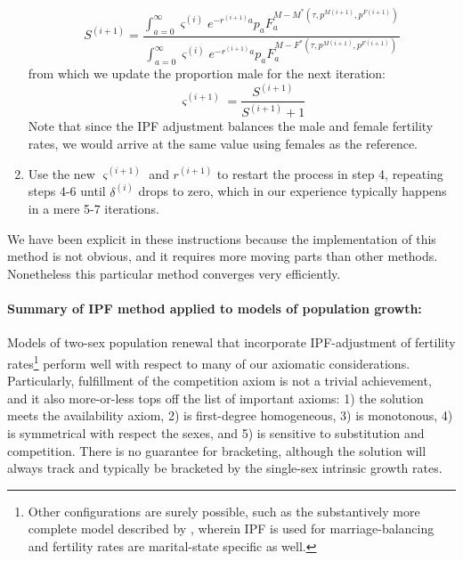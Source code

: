 \begin{enumerate}
  \begin{equation}
  S^{(i+1)} = \frac{\int_{a=0}^\infty \varsigma^{(i)}
  e^{-r^{(i+1)}a}p_aF_a^{M-M^\ast(\tau,p^{M(i+1)}, p^{F(i+1)})}}{\int_{a=0}^\infty
  \varsigma^{(i)} e^{-r^{(i+1)}a}p_aF_a^{M-F^\ast(\tau,p^{M(i+1)}, p^{F(i+1)})}}
  \end{equation}
  from which we update the proportion male for the next iteration:
  \begin{equation}
  \varsigma^{(i+1)} = \frac{S^{(i+1)}}{S^{(i+1)}+1}
  \end{equation} 
  Note that since the IPF adjustment balances the male and female fertility
  rates, we would arrive at the same value using females as the reference.
  \item Use the new $\varsigma^{(i+1)}$ and $r^{(i+1)}$ to restart the process
  in step 4, repeating steps 4-6 until $\delta^{(i)}$ drops to zero, which
  in our experience typically happens in a mere 5-7 iterations.
\end{enumerate}

We have been explicit in these instructions because the implementation of this
method is not obvious, and it requires more moving parts than other
methods. Nonetheless this particular method converges very efficiently.

\paragraph{Summary of IPF method applied to models of population growth:
}
Models of two-sex population renewal that incorporate IPF-adjustment of
fertility rates\footnote{Other configurations are surely possible, such as the
substantively more complete model described by \citet{Matthews2013}, wherein IPF
is used for marriage-balancing and fertility rates are marital-state specific
as well.} perform well with respect to many of our axiomatic considerations.
Particularly, fulfillment of the competition axiom is not a trivial achievement, 
and it also more-or-less tops off the list of important axioms: 1) the solution
 meets the availability axiom, 2) is first-degree homogeneous, 3) is monotonous, 4) is symmetrical with
respect the sexes, and 5) is sensitive to substitution and competition.
There is no guarantee for bracketing, although the solution will always track and typically
be bracketed by the single-sex intrinsic growth rates. 

